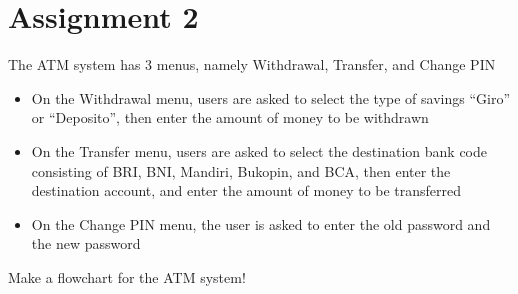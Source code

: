 \documentclass[12pt,titlepage]{article}
\begin{document}
\pagebreak

\section{Assignment 2}
The ATM system has 3 menus, namely Withdrawal, Transfer, and Change PIN
\begin{itemize}
    \item {
        On the Withdrawal menu, users are asked to select the type of savings
        “Giro” or “Deposito”, then enter the amount of money to be withdrawn
    }
    \item {
        On the Transfer menu, users are asked to select the destination bank code
        consisting of BRI, BNI, Mandiri, Bukopin, and BCA, then enter the
        destination account, and enter the amount of money to be transferred
    }
    \item {
        On the Change PIN menu, the user is asked to enter the old password and
        the new password
    }
\end{itemize}
Make a flowchart for the ATM system!
\end{document}
